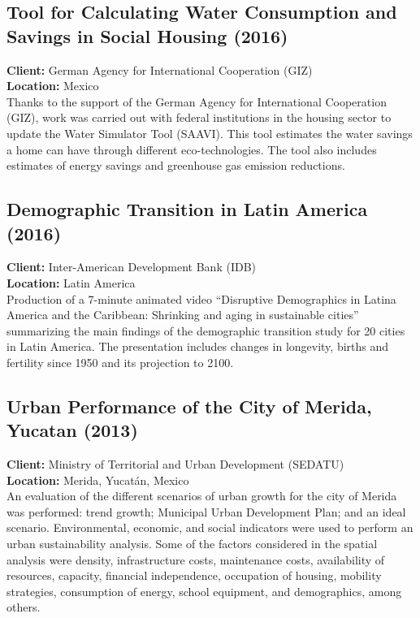 \documentclass[
	a4paper,
	12pt,
	unnumberedsections,
]{CSSullivanBusinessReport}
\begin{document}
\subsection{Tool for Calculating Water Consumption and Savings in Social Housing (2016)}
\textbf{Client:}  German Agency for International Cooperation (GIZ) \\
\textbf{Location:}  Mexico	 \\[0.5em]
 Thanks to the support of the German Agency for International Cooperation (GIZ), work was carried out with federal institutions in the housing sector to update the Water Simulator Tool (SAAVI). This tool estimates the water savings a home can have through different eco-technologies. The tool also includes estimates of energy savings and greenhouse gas emission reductions.

\subsection{Demographic Transition in Latin America (2016)}
\textbf{Client:}  Inter-American Development Bank (IDB) \\
\textbf{Location:}  Latin America	 \\[0.5em]
 Production of a 7-minute animated video “Disruptive Demographics in Latina America and the Caribbean: Shrinking and aging in sustainable cities” summarizing the main findings of the demographic transition study for 20 cities in Latin America. The presentation includes changes in longevity, births and fertility since 1950 and its projection to 2100.

\subsection{Urban Performance of the City of Merida, Yucatan (2013)}
\textbf{Client:}  Ministry of Territorial and Urban Development (SEDATU) \\
\textbf{Location:}  Merida, Yucatán, Mexico \\[0.5em]
 An evaluation of the different scenarios of urban growth for the city of Merida was performed: trend growth; Municipal Urban Development Plan; and an ideal scenario. Environmental, economic, and social indicators were used to perform an urban sustainability analysis. Some of the factors considered in the spatial analysis were density, infrastructure costs, maintenance costs, availability of resources, capacity, financial independence, occupation of housing, mobility strategies, consumption of energy, school equipment, and demographics, among others.
\end{document}
